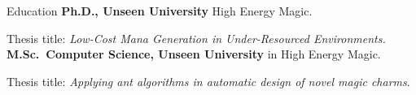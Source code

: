\begin{rubric}{Education}
\entry*[2009 -- 2013]%
	\textbf{Ph.D., Unseen University} High Energy Magic.
	\par Thesis title: \emph{Low-Cost Mana Generation in Under-Resourced Environments.}
%
\entry*[2003 -- 2006]%
	\textbf{M.Sc.~Computer Science, Unseen University} in High Energy Magic.\par
	Thesis title: \emph{Applying ant algorithms in automatic design of novel magic charms}.
\end{rubric}